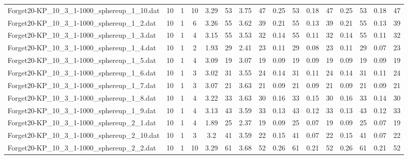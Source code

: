 \begin{sidewaystable}[!ht]
{\begin{tabular}{lccccccccccccccc}
Forget20-KP\_10\_3\_1-1000\_sphereup\_1\_10.dat & 10 & 1 & 10 & 3.29 & 53 & 3.75 & 47 & 0.25 & 53 &  \textcolor{blue2}{0.18} & 47 & 0.25 & 53 &  \textcolor{blue2}{0.18} & 47 \\
Forget20-KP\_10\_3\_1-1000\_sphereup\_1\_2.dat & 10 & 1 & 6 & 3.26 & 55 & 3.62 & 39 & 0.21 & 55 &  \textcolor{blue2}{0.13} & 39 & 0.21 & 55 &  \textcolor{blue2}{0.13} & 39 \\
Forget20-KP\_10\_3\_1-1000\_sphereup\_1\_3.dat & 10 & 1 & 4 & 3.15 & 55 & 3.53 & 32 & 0.14 & 55 &  \textcolor{blue2}{0.11} & 32 & 0.14 & 55 &  \textcolor{blue2}{0.11} & 32 \\
Forget20-KP\_10\_3\_1-1000\_sphereup\_1\_4.dat & 10 & 1 & 2 & 1.93 & 29 & 2.41 & 23 & 0.11 & 29 & 0.08 & 23 & 0.11 & 29 &  \textcolor{blue2}{0.07} & 23 \\
Forget20-KP\_10\_3\_1-1000\_sphereup\_1\_5.dat & 10 & 1 & 4 & 3.09 & 19 & 3.07 & 19 &  \textcolor{blue2}{0.09} & 19 &  \textcolor{blue2}{0.09} & 19 &  \textcolor{blue2}{0.09} & 19 &  \textcolor{blue2}{0.09} & 19 \\
Forget20-KP\_10\_3\_1-1000\_sphereup\_1\_6.dat & 10 & 1 & 3 & 3.02 & 31 & 3.55 & 24 & 0.14 & 31 &  \textcolor{blue2}{0.11} & 24 & 0.14 & 31 &  \textcolor{blue2}{0.11} & 24 \\
Forget20-KP\_10\_3\_1-1000\_sphereup\_1\_7.dat & 10 & 1 & 3 & 3.07 & 21 & 3.63 & 21 &  \textcolor{blue2}{0.09} & 21 &  \textcolor{blue2}{0.09} & 21 &  \textcolor{blue2}{0.09} & 21 &  \textcolor{blue2}{0.09} & 21 \\
Forget20-KP\_10\_3\_1-1000\_sphereup\_1\_8.dat & 10 & 1 & 4 & 3.22 & 33 & 3.63 & 30 & 0.16 & 33 & 0.15 & 30 & 0.16 & 33 &  \textcolor{blue2}{0.14} & 30 \\
Forget20-KP\_10\_3\_1-1000\_sphereup\_1\_9.dat & 10 & 1 & 4 & 3.13 & 43 & 3.59 & 33 & 0.13 & 43 &  \textcolor{blue2}{0.12} & 33 & 0.13 & 43 &  \textcolor{blue2}{0.12} & 33 \\
Forget20-KP\_10\_3\_1-1000\_sphereup\_2\_1.dat & 10 & 1 & 4 & 1.89 & 25 & 2.37 & 19 & 0.09 & 25 &  \textcolor{blue2}{0.07} & 19 & 0.09 & 25 &  \textcolor{blue2}{0.07} & 19 \\
Forget20-KP\_10\_3\_1-1000\_sphereup\_2\_10.dat & 10 & 1 & 3 & 3.2 & 41 & 3.59 & 22 & 0.15 & 41 &  \textcolor{blue2}{0.07} & 22 & 0.15 & 41 &  \textcolor{blue2}{0.07} & 22 \\
Forget20-KP\_10\_3\_1-1000\_sphereup\_2\_2.dat & 10 & 1 & 10 & 3.29 & 61 & 3.68 & 52 & 0.26 & 61 &  \textcolor{blue2}{0.21} & 52 & 0.26 & 61 &  \textcolor{blue2}{0.21} & 52 \\

\end{tabular}}
\end{sidewaystable}
